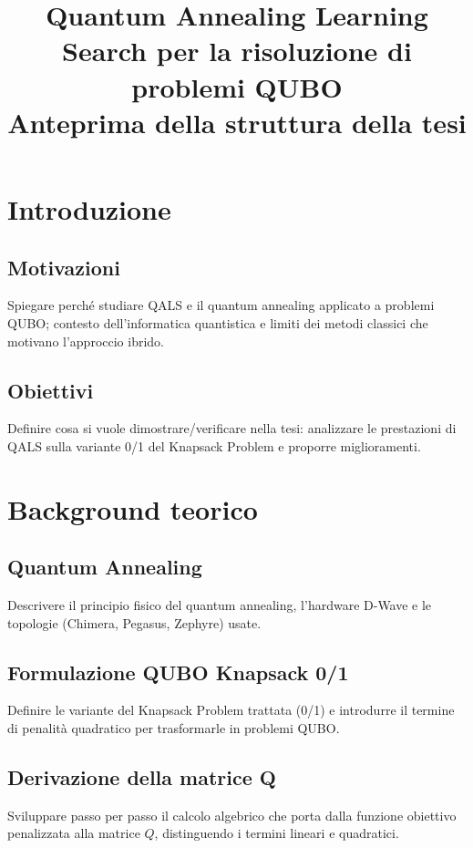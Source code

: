 \documentclass[12pt,a4paper,oneside]{report}
\title{\textbf{Quantum Annealing Learning Search per la risoluzione di problemi QUBO} \\[0.3cm]
\large Anteprima della struttura della tesi}
\date{}
\begin{document}
 
\maketitle
 
\tableofcontents
 
\chapter{Introduzione}
 
\section{Motivazioni}
Spiegare perché studiare QALS e il quantum annealing applicato a problemi QUBO;
contesto dell'informatica quantistica e limiti dei metodi classici che motivano
l'approccio ibrido.
 
\section{Obiettivi}
Definire cosa si vuole dimostrare/verificare nella tesi: analizzare le prestazioni
di QALS sulla variante 0/1 del Knapsack Problem e proporre miglioramenti.
 
\chapter{Background teorico}

\section{Quantum Annealing}
Descrivere il principio fisico del quantum annealing, l'hardware D-Wave e 
le topologie (Chimera, Pegasus, Zephyre) usate.

\section{Formulazione QUBO  Knapsack 0/1}
Definire le variante del Knapsack Problem trattata (0/1) e introdurre il 
termine di penalità quadratico per trasformarle in problemi QUBO.

\section{Derivazione della matrice Q}
Sviluppare passo per passo il calcolo algebrico che porta dalla funzione
obiettivo penalizzata alla matrice $Q$, distinguendo i termini lineari e
quadratici.
\end{document}

